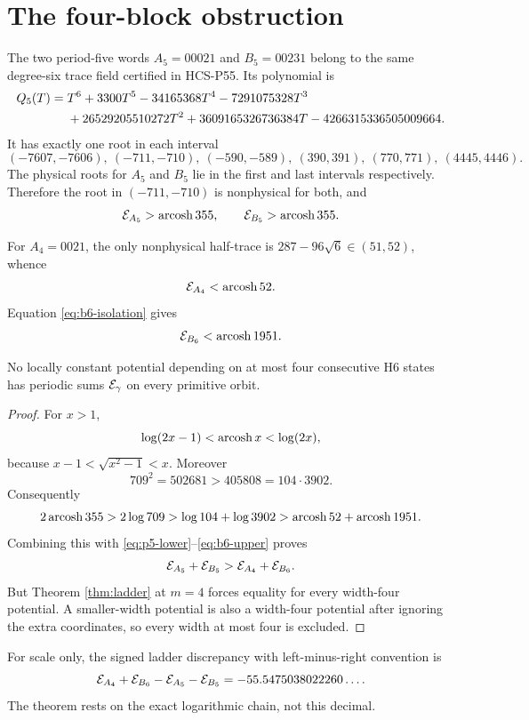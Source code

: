 \section{The four-block obstruction}

The two period-five words \(A_5=00021\) and \(B_5=00231\) belong to the
same degree-six trace field certified in HCS-P55.  Its polynomial is
\begin{align}\label{eq:q5}
 Q_5(T)={}&T^6+3300T^5-34165368T^4-7291075328T^3\notag\\
 &+26529205510272T^2+3609165326736384T
 -4266315336505009664.
\end{align}
It has exactly one root in each interval
\begin{equation}\label{eq:q5-intervals}
 (-7607,-7606),\ (-711,-710),\ (-590,-589),\
 (390,391),\ (770,771),\ (4445,4446).
\end{equation}
The physical roots for \(A_5\) and \(B_5\) lie in the first and last
intervals respectively.  Therefore the root in \((-711,-710)\) is
nonphysical for both, and
\begin{equation}\label{eq:p5-lower}
 \mathcal E_{A_5}>\operatorname{arcosh}355,
 \qquad
 \mathcal E_{B_5}>\operatorname{arcosh}355.
\end{equation}

For \(A_4=0021\), the only nonphysical half-trace is
\(287-96\sqrt6\in(51,52)\), whence
\begin{equation}\label{eq:a4-upper}
 \mathcal E_{A_4}<\operatorname{arcosh}52.
\end{equation}
Equation \eqref{eq:b6-isolation} gives
\begin{equation}\label{eq:b6-upper}
 \mathcal E_{B_6}<\operatorname{arcosh}1951.
\end{equation}

\begin{theorem}\label{thm:four-block}
No locally constant potential depending on at most four consecutive H6
states has periodic sums \(\mathcal E_\gamma\) on every primitive orbit.
\end{theorem}

\begin{proof}
For \(x>1\),
\[
 \log(2x-1)<\operatorname{arcosh} x<\log(2x),
\]
because \(x-1<\sqrt{x^2-1}<x\).  Moreover
\[
 709^2=502681>405808=104\cdot3902.
\]
Consequently
\[
 2\operatorname{arcosh}355>2\log709
 >\log104+\log3902
 >\operatorname{arcosh}52+\operatorname{arcosh}1951.
\]
Combining this with \eqref{eq:p5-lower}--\eqref{eq:b6-upper} proves
\begin{equation}\label{eq:strict-obstruction}
 \mathcal E_{A_5}+\mathcal E_{B_5}
 >\mathcal E_{A_4}+\mathcal E_{B_6}.
\end{equation}
But Theorem \ref{thm:ladder} at \(m=4\) forces equality for every width-four
potential.  A smaller-width potential is also a width-four potential after
ignoring the extra coordinates, so every width at most four is excluded.
\end{proof}

For scale only, the signed ladder discrepancy with left-minus-right
convention is
\[
 \mathcal E_{A_4}+\mathcal E_{B_6}-\mathcal E_{A_5}-\mathcal E_{B_5}
 =-55.5475038022260\ldots .
\]
The theorem rests on the exact logarithmic chain, not this decimal.

